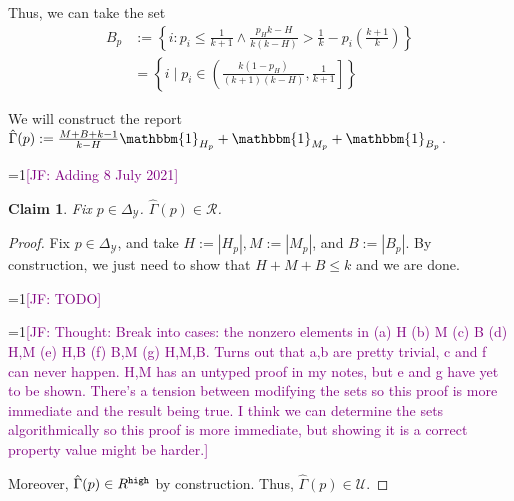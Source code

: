 \documentclass[12pt]{article}
\newcommand{\Comments}{1}
\newcommand{\mynote}[2]{\ifnum\Comments=1\textcolor{#1}{#2}\fi}
\newcommand{\jessie}[1]{\mynote{purple}{[JF: #1]}}
\newcommand{\simplex}{\Delta_\Y}
\newcommand{\R}{\mathcal{R}}
\newcommand{\U}{\mathcal{U}}
\newcommand{\Y}{\mathcal{Y}}
\newcommand{\ones}{\mathbbm{1}}
\newtheorem{claim}{Claim}
\begin{document}
Thus, we can take the set 
\begin{align*}
B_p &:= \left\{i : p_i \leq \frac{1}{k+1} \wedge \frac{p_H k- H}{k(k- H)} > \frac 1 k - p_i\left(\frac{k+1}{k}\right) \right\}\\
&=\left\{i \mid p_i \in \left(\frac {k(1-p_H)}{(k+1)(k-H)}, \frac 1 {k+1} \right]\right\}
\end{align*}


We will construct the report $\hat \Gamma(p) := \frac{M + B + k - 1}{k-H}\ones_{H_p} + \ones_{M_p} + \ones_{B_p}$.


\jessie{Adding 8 July 2021}


\begin{claim}
	Fix $p \in \simplex$.
	$\hat \Gamma(p) \in \R$.
\end{claim}	
\begin{proof}
	Fix $p \in \simplex$, and take $H := |H_p|, M:= |M_p|$, and $B := |B_p|$.
	By construction, we just need to show that $H + M + B \leq k$ and we are done.
	
	\jessie{TODO}
	
	
	\jessie{Thought: Break into cases: the nonzero elements in (a) H (b) M (c) B (d) H,M (e) H,B (f) B,M (g) H,M,B.  Turns out that a,b are pretty trivial, c and f can never happen.  H,M has an untyped proof in my notes, but e and g have yet to be shown.  There's a tension between modifying the sets so this proof is more immediate and the result being true.  I think we can determine the sets algorithmically so this proof is more immediate, but showing it is a correct property value might be harder.}
	
	
	Moreover, $\hat \Gamma(p) \in R^{\tt high}$ by construction.
	Thus, $\hat \Gamma(p) \in \U$.
\end{proof}
\end{document}
